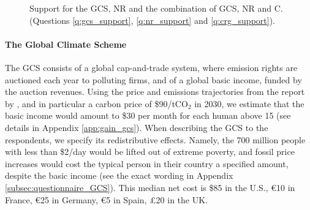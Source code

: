 \begin{figure}[h!]
    \caption[Support for the Global Climate Scheme]{Support for the GCS, NR and the combination of GCS, NR and C. (Questions \ref{q:gcs_support}, \ref{q:nr_support} and \ref{q:crg_support}).%
    }\label{fig:support_binary}
\end{figure}

\begin{tcolorbox}
  \paragraph{The Global Climate Scheme} The GCS consists of a global cap-and-trade system, where emission rights are auctioned each year to polluting firms, and of a global basic income, funded by the auction revenues. 
  Using the price and emissions trajectories from the report by \cite{stern_report_2017}, %
  and in particular a carbon price of \$90/tCO$_\text{2}$ in 2030, we estimate that the basic income would amount to \$30 per month for each human above 15 (see details in Appendix \ref{app:gain_gcs}). %
  When describing the GCS to the respondents, we specify its redistributive effects. Namely, %
  the 700 million people with less than \$2/day would be lifted out of extreme poverty, and fossil price increases would cost the typical person in their country a specified amount, despite the basic income (see the exact wording in Appendix \ref{subsec:questionnaire_GCS}). This median net cost is \$85 in the U.S., \euro{}10 in France, \euro{}25 in Germany, \euro{}5 in Spain, £20 in the UK. %
\end{tcolorbox}

